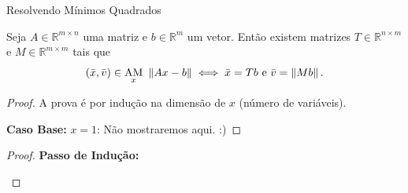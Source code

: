 
\begin{frame}[fragile]{Resolvendo Mínimos Quadrados}
  \begin{theorem}
    Seja $A \in \mathbb{R}^{m \times n}$ uma matriz e $b \in \mathbb{R}^{m}$ um vetor. Então existem matrizes $T \in \mathbb{R}^{n \times m}$ e $M \in \mathbb{R}^{m \times m}$ tais que
    \[
      (\bar{x}, \bar{v})
      \in
      \underset{x}{\mathrm{AM}}\,\, \left\lVert Ax - b\right\rVert
      \iff
      \bar{x} = T b \text{ e } \bar{v} = \left\lVert M b\right\rVert.
    \]
  \end{theorem}
  \pause
  \begin{proof}
    A prova é por indução na dimensão de $x$ (número de variáveis).

    \vspace{0.6cm} \pause

    \textbf{Caso Base:} $x=1$: Não mostraremos aqui. :)
    \renewcommand{\qedsymbol}{}
  \end{proof}
\end{frame}

\begin{frame}
  \begin{proof}
    \textbf{Passo de Indução:}
    \begin{calcproof}[]
    \end{calcproof}
    \renewcommand{\qedsymbol}{}
  \end{proof}
\end{frame}

